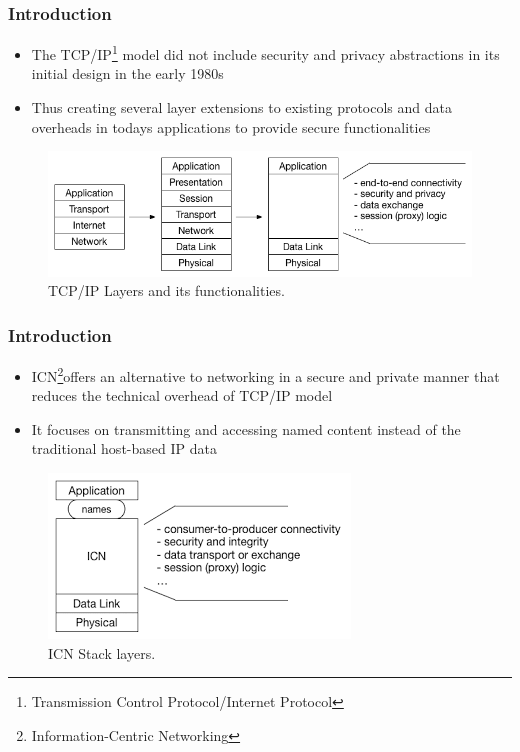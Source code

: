 \documentclass{beamer}
\begin{document}
\begin{frame}
\frametitle{Introduction}
\begin{itemize}
	\item The TCP/IP\footnote{Transmission Control Protocol/Internet Protocol} model did not include security and privacy abstractions in its initial design in the early 1980s
	\item Thus creating several layer extensions to existing protocols and data overheads  in todays applications to provide secure functionalities
\end{itemize}
 
\begin{figure}
	\includegraphics[width=\linewidth,height=0.3\textheight]{ccn_stack.png}
	\caption{TCP/IP Layers and its functionalities.}
\end{figure}


\end{frame}
\begin{frame}
\frametitle{Introduction}
\begin{itemize}
	\item ICN\footnote{Information-Centric Networking}offers an alternative to networking in a secure and private manner that reduces the technical overhead of TCP/IP model
	\item It focuses on transmitting and accessing named content instead of the traditional host-based IP data
\end{itemize}
 

\begin{figure}
	\includegraphics[width=0.6\linewidth,height=0.4\textheight]{stack.png}
	\caption{ICN Stack layers.}
\end{figure}
\end{frame}
\end{document}
